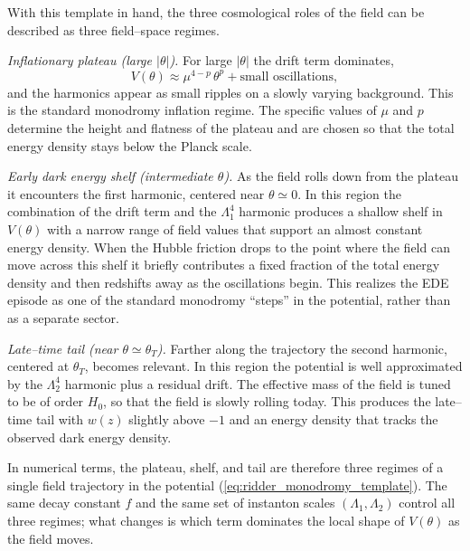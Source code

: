 \documentclass[a4paper,11pt]{article}
\begin{document}
With this template in hand, the three cosmological roles of the field can be described as three field–space regimes.

\textit{Inflationary plateau (large $|\theta|$).} For large $|\theta|$ the drift term dominates,
\begin{equation}
    V(\theta) \approx \mu^{4-p}\,\theta^{p} + \text{small oscillations},
\end{equation}
and the harmonics appear as small ripples on a slowly varying background. This is the standard monodromy inflation regime. The specific values of $\mu$ and $p$ determine the height and flatness of the plateau and are chosen so that the total energy density stays below the Planck scale.

\textit{Early dark energy shelf (intermediate $\theta$).} As the field rolls down from the plateau it encounters the first harmonic, centered near $\theta \simeq 0$. In this region the combination of the drift term and the $\Lambda_1^4$ harmonic produces a shallow shelf in $V(\theta)$ with a narrow range of field values that support an almost constant energy density. When the Hubble friction drops to the point where the field can move across this shelf it briefly contributes a fixed fraction of the total energy density and then redshifts away as the oscillations begin. This realizes the EDE episode as one of the standard monodromy ``steps'' in the potential, rather than as a separate sector.

\textit{Late–time tail (near $\theta \simeq \theta_T$).} Farther along the trajectory the second harmonic, centered at $\theta_T$, becomes relevant. In this region the potential is well approximated by the $\Lambda_2^4$ harmonic plus a residual drift. The effective mass of the field is tuned to be of order $H_0$, so that the field is slowly rolling today. This produces the late–time tail with $w(z)$ slightly above $-1$ and an energy density that tracks the observed dark energy density.

In numerical terms, the plateau, shelf, and tail are therefore three regimes of a single field trajectory in the potential (\ref{eq:ridder_monodromy_template}). The same decay constant $f$ and the same set of instanton scales $(\Lambda_1, \Lambda_2)$ control all three regimes; what changes is which term dominates the local shape of $V(\theta)$ as the field moves.

\end{document}
